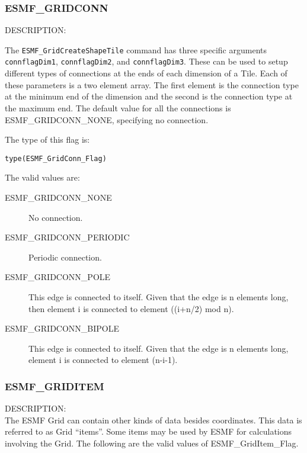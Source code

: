 
\subsubsection{ESMF\_GRIDCONN}
\label{const:gridconn}

{\sf DESCRIPTION:\\}
\begin{sloppypar}
The {\tt ESMF\_GridCreateShapeTile} command has three specific arguments
{\tt connflagDim1}, {\tt connflagDim2}, and {\tt connflagDim3}. These can be used
to setup different types of connections at the ends of each dimension
of a Tile.  Each of these parameters is a two element array. The first
element is the connection type at the minimum end of the dimension
and the second is the connection type at the maximum end. The default
value for all the connections is ESMF\_GRIDCONN\_NONE, specifying no
connection.
\end{sloppypar}

The type of this flag is:

{\tt type(ESMF\_GridConn\_Flag)}

The valid values are:
\begin{description}
\item [ESMF\_GRIDCONN\_NONE] No connection.

\item [ESMF\_GRIDCONN\_PERIODIC] Periodic connection.

\item [ESMF\_GRIDCONN\_POLE] This edge is connected to itself. Given
that the edge is n elements long, then element i is connected to
element ((i+n/2) mod n).

\item [ESMF\_GRIDCONN\_BIPOLE] This edge is connected to itself. Given
that the edge is n elements long, element i is connected to element (n-i-1).
\end{description}


\subsubsection{ESMF\_GRIDITEM}
\label{const:griditem}

{\sf DESCRIPTION:\\}
The ESMF Grid can contain other kinds of data besides coordinates. 
This data is referred to as Grid ``items''. Some items may be used
by ESMF for calculations involving the Grid. The following
are the valid values of ESMF\_GridItem\_Flag.

